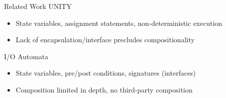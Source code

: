 \documentclass{beamer}
\begin{document}
\begin{frame}{Related Work}
  UNITY
  \begin{itemize}
  \item State variables, assignment statements, non-deterministic execution
  \item Lack of encapsulation/interface precludes compositionality
  \end{itemize}

  I/O Automata
  \begin{itemize}
  \item State variables, pre/post conditions, signatures (interfaces)
  \item Composition limited in depth, no third-party composition
  \end{itemize}

\end{frame}
\end{document}
